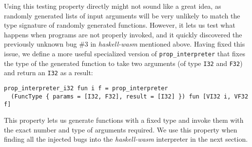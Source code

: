 \documentclass[sigconf,review,anonymous]{acmart}
\newcommand{\mutagen}{\textsc{Mutagen}\xspace}
\begin{document}
Using this testing property directly might not sound like a great idea, as
randomly generated lists of input arguments will be very unlikely to match the
type signature of randomly generated functions.
%
However, it lets us test what happens when programs are not properly invoked,
and it quickly discovered the previously unknown bug \#3 in
\textit{haskell-wasm} mentioned above.
%
Having fixed this issue, we define a more useful specialized version of
\texttt{prop\_interpreter} that fixes the type of the generated function to take
two arguments (of type \texttt{I32} and \texttt{F32}) and return an \texttt{I32}
as a result:

\begin{verbatim}
prop_interpreter_i32 fun i f = prop_interpreter
  (FuncType { params = [I32, F32], result = [I32] }) fun [VI32 i, VF32 f]
\end{verbatim}

\noindent This property lets us generate functions with a fixed type and invoke
them with the exact number and type of arguments required.
%
%
We use this property when finding all the injected bugs into the
\textit{haskell-wasm} interpreter in the next section.
%


\end{document}
